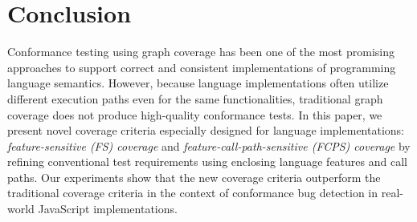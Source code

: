 \section{Conclusion}\label{sec:conclusion}
Conformance testing using graph coverage has been one of the most
promising approaches to support correct and consistent implementations
of programming language semantics.
However, because language implementations often utilize 
different execution paths even for the same functionalities,
traditional graph coverage does not produce high-quality conformance tests.
In this paper, we present novel coverage criteria especially designed
for language implementations: \textit{feature-sensitive (FS) coverage} and
\textit{feature-call-path-sensitive (FCPS) coverage}
by refining conventional test requirements using
enclosing language features and call paths.
Our experiments show that the new coverage criteria outperform the
traditional coverage criteria in the context of conformance bug detection in
real-world JavaScript implementations.
